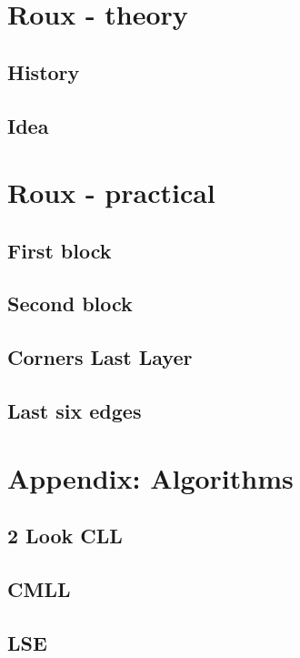 \documentclass{scrreprt}
\begin{document}
\chapter{Roux - theory}

\section{History}

\section{Idea}

\chapter{Roux - practical}

\section{First block}

\section{Second block}

\section{Corners Last Layer}

\section{Last six edges}

\chapter{Appendix: Algorithms}

\section{2 Look CLL}

\section{CMLL}

\section{LSE}
\end{document}

